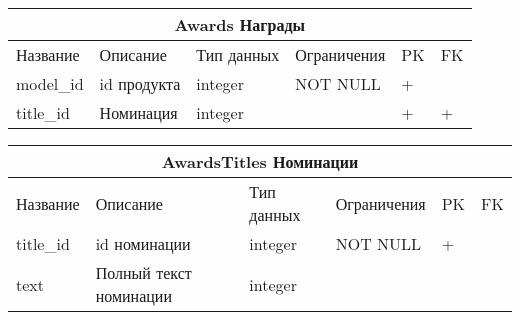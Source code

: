 \documentclass{article}
\begin{document}
\begin{tabular}{ |p{4.5cm}|p{4cm}|p{3cm}|p{3cm}|p{2cm}|p{1cm}| }
\hline
\multicolumn{6}{|c|}{Awards Награды} \\
\hline
Название & Описание & Тип данных & Ограничения & PK & FK\\
\hline
model\_id                           &   %
id продукта                         &   %
integer                             &   %
NOT NULL                            &   %
 +                                  &   %
                                    \\  %
\hline
title\_id                           &   %
Номинация                           &   %
integer                             &   %
                                    &   %
 +                                  &   %
 +                                  \\  %
\hline
\end{tabular}

\begin{tabular}{ |p{4.5cm}|p{4cm}|p{3cm}|p{3cm}|p{2cm}|p{1cm}| }
\hline
\multicolumn{6}{|c|}{AwardsTitles Номинации} \\
\hline
Название & Описание & Тип данных & Ограничения & PK & FK\\
\hline
title\_id                           &   %
id номинации                        &   %
integer                             &   %
NOT NULL                            &   %
 +                                  &   %
                                    \\  %
\hline
text                                &   %
Полный текст номинации              &   %
integer                             &   %
                                    &   %
                                    &   %
                                    \\  %
\hline
\end{tabular}
\end{document}
